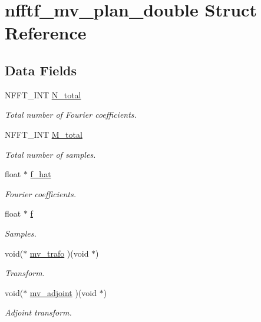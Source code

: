 \hypertarget{structnfftf__mv__plan__double}{\section{nfftf\-\_\-mv\-\_\-plan\-\_\-double Struct Reference}
\label{structnfftf__mv__plan__double}
}
\subsection*{Data Fields}
\begin{DoxyCompactItemize}
\item 
N\-F\-F\-T\-\_\-\-I\-N\-T \hyperlink{structnfftf__mv__plan__double_aecb1a9c6bbbb97f0b16111c62ac88389}{N\-\_\-total}
\begin{DoxyCompactList}\small\item\em Total number of Fourier coefficients. \end{DoxyCompactList}\item 
N\-F\-F\-T\-\_\-\-I\-N\-T \hyperlink{structnfftf__mv__plan__double_afd67e4d01f02df914834b0f3f04d2b3b}{M\-\_\-total}
\begin{DoxyCompactList}\small\item\em Total number of samples. \end{DoxyCompactList}\item 
float $\ast$ \hyperlink{structnfftf__mv__plan__double_a109229f89032f01e4b2bece93297189c}{f\-\_\-hat}
\begin{DoxyCompactList}\small\item\em Fourier coefficients. \end{DoxyCompactList}\item 
float $\ast$ \hyperlink{structnfftf__mv__plan__double_a0b25cac2771ce5e3048ddc1b708e9005}{f}
\begin{DoxyCompactList}\small\item\em Samples. \end{DoxyCompactList}\item 
void($\ast$ \hyperlink{structnfftf__mv__plan__double_a130252f4a197b65416311097880cff4f}{mv\-\_\-trafo} )(void $\ast$)
\begin{DoxyCompactList}\small\item\em Transform. \end{DoxyCompactList}\item 
void($\ast$ \hyperlink{structnfftf__mv__plan__double_a3d0e47cf55f04c89523abd46f361ef91}{mv\-\_\-adjoint} )(void $\ast$)
\begin{DoxyCompactList}\small\item\em Adjoint transform. \end{DoxyCompactList}\end{DoxyCompactItemize}


